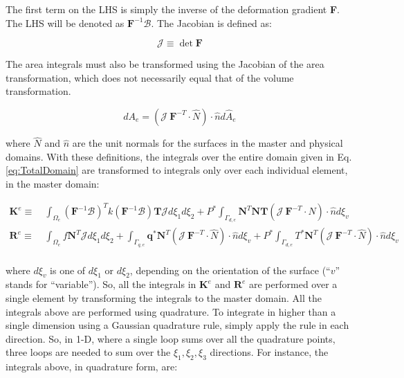 \documentclass[10pt]{article}
\begin{document}
The first term on the LHS is simply the inverse of the deformation gradient \textbf{F}. The LHS will be denoted as \(\textbf{F}^{-1}\mathscr{B}\). The Jacobian is defined as:

\begin{equation}
\mathscr{J}\equiv\det{\textbf{F}}
\end{equation}

The area integrals must also be transformed using the Jacobian of the area transformation, which does not necessarily equal that of the volume transformation. 

\begin{equation}
\label{eq:Nanson}
dA_e=(\mathscr{J}\ \textbf{F}^{-T}\cdot\hat{N})\cdot\hat{n}d\hat{A}_e
\end{equation}

where \(\hat{N}\) and \(\hat{n}\) are the unit normals for the surfaces in the master and physical domains. With these definitions, the integrals over the entire domain given in Eq. \eqref{eq:TotalDomain} are transformed to integrals only over each individual element, in the master domain:

\begin{equation}
\label{eq:MasterDomain}
\begin{aligned}
\textbf{K}^e\equiv&\ \int_{\Omega_e}(\textbf{F}^{-1}\mathscr{B})^Tk(\textbf{F}^{-1}\mathscr{B})\textbf{T} \mathscr{J}d\xi_1d\xi_2+P^{*}\int_{\Gamma_{d,e}}\textbf{N}^T\textbf{N}\textbf{T}(\mathscr{J}\ \textbf{F}^{-T}\cdot\hat{N})\cdot\hat{n}d\xi_v\\
\textbf{R}^e\equiv&\ \int_{\Omega_e}f\textbf{N}^T \mathscr{J}d\xi_1d\xi_2+\int_{\Gamma_{q,e}}\textbf{q}^{*}\textbf{N}^T (\mathscr{J}\ \textbf{F}^{-T}\cdot\hat{N})\cdot\hat{n}d\xi_v+P^{*}\int_{\Gamma_{d,e}}T^{*}\textbf{N}^T (\mathscr{J}\ \textbf{F}^{-T}\cdot\hat{N})\cdot\hat{n}d\xi_v\\
\end{aligned}
\end{equation}

where \(d\xi_v\) is one of \(d\xi_1\) or \(d\xi_2\), depending on the orientation of the surface (``\(v\)'' stands for ``variable''). So, all the integrals in \(\textbf{K}^e\) and \(\textbf{R}^e\) are performed over a single element by transforming the integrals to the master domain. All the integrals above are performed using quadrature. To integrate in higher than a single dimension using a Gaussian quadrature rule, simply apply the rule in each direction. So, in 1-D, where a single loop sums over all the quadrature points, three loops are needed to sum over the \(\xi_1,\xi_2,\xi_3\) directions. For instance, the integrals above, in quadrature form, are:
\end{document}

